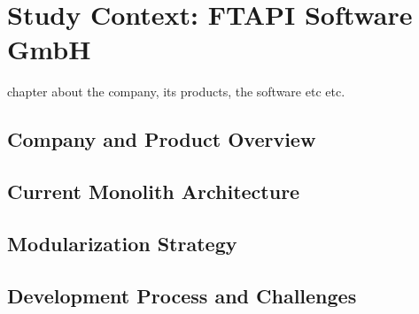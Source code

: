 \chapter{Study Context: FTAPI Software GmbH}
chapter about the company, its products, the software etc etc.
\section{Company and Product Overview}
\section{Current Monolith Architecture}
\section{Modularization Strategy}
\section{Development Process and Challenges}